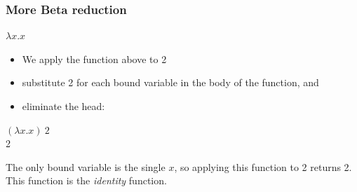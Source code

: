 \documentclass{beamer}
\begin{document}
\begin{frame} [fragile, label = test]
    \frametitle{More Beta reduction}
  
   \begin{center}
   $\lambda x.x$
   \end{center}
   \pause
   \begin{itemize}
   \item We apply the function above to 2
   \pause
   \item substitute 2 for each bound variable in the body of the function, and 
   \pause
   \item eliminate the head:
   \end{itemize}
   \begin{center}
    \pause
   $(\lambda x.x) \ 2  $ \\
   
   \hspace*{.5in}2
   \end{center}
   \pause
   The only bound variable is the single $x$, so applying this function to 2 returns 2. This function is the \textit{identity} function.

   \end{frame}
\end{document}
